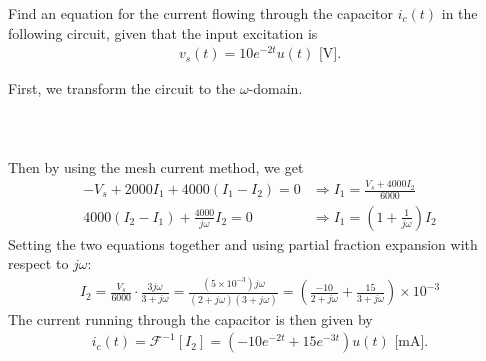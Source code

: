\documentclass{report}
\begin{document}
\begin{example}
    Find an equation for the current flowing through the capacitor $i_c(t)$ in the following circuit, given that the input excitation is 
    \begin{align*}
        v_s(t) = 10e^{-2t}u(t) \text{ [V]}.
    \end{align*}
\end{example}
\begin{solution}
    First, we transform the circuit to the $\omega$-domain. \\ \\
    \\ \\
    Then by using the mesh current method, we get 
    \begin{align*}
        -V_s + 2000I_1 + 4000(I_1-I_2) = 0 &\Longrightarrow I_1 = \frac{V_s + 4000I_2}{6000} \\
        4000(I_2-I_1) + \frac{4000}{j\omega}I_2 = 0 &\Longrightarrow I_1 = \left(1+\frac{1}{j\omega}\right)I_2
    \end{align*}
    Setting the two equations together and using partial fraction expansion with respect to $j\omega$:
    \begin{align*}
        I_2 = \frac{V_s}{6000}\cdot\frac{3j\omega}{3+j\omega} = \frac{(5\times10^{-3})j\omega}{(2+j\omega)(3+j\omega)} = \left(\frac{-10}{2+j\omega} + \frac{15}{3+j\omega}\right)\times 10^{-3}
    \end{align*}
    The current running through the capacitor is then given by 
    \begin{align*}
        i_c(t) = \mathcal{F}^{-1}[I_2] = (-10e^{-2t} + 15e^{-3t})u(t) \text{ [mA]}.
    \end{align*}
\end{solution}
\end{document}
